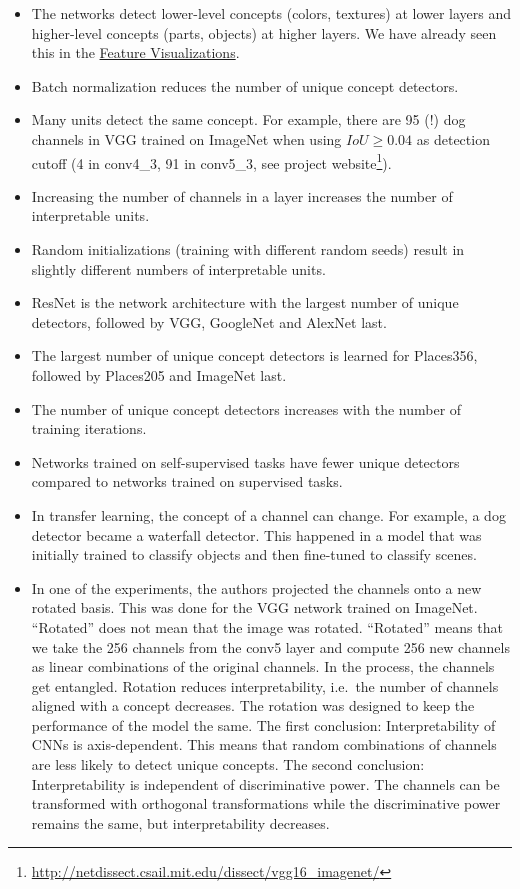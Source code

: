 \documentclass[
  10pt,
]{scrbook}
\providecommand{\tightlist}{%
  \setlength{\itemsep}{0pt}\setlength{\parskip}{0pt}}
\renewcommand{\href}[2]{#2\footnote{\url{#1}}}
\begin{document}
\begin{itemize}
\tightlist
\item
  The networks detect lower-level concepts (colors, textures) at lower layers and higher-level concepts (parts, objects) at higher layers.
  We have already seen this in the \protect\hyperlink{feature-visualization}{Feature Visualizations}.
\item
  Batch normalization reduces the number of unique concept detectors.
\item
  Many units detect the same concept.
  For example, there are 95 (!) dog channels in VGG trained on ImageNet when using \(IoU \geq 0.04\) as detection cutoff (4 in conv4\_3, 91 in conv5\_3, see \href{http://netdissect.csail.mit.edu/dissect/vgg16_imagenet/}{project website}).
\item
  Increasing the number of channels in a layer increases the number of interpretable units.
\item
  Random initializations (training with different random seeds) result in slightly different numbers of interpretable units.
\item
  ResNet is the network architecture with the largest number of unique detectors, followed by VGG, GoogleNet and AlexNet last.
\item
  The largest number of unique concept detectors is learned for Places356, followed by Places205 and ImageNet last.
\item
  The number of unique concept detectors increases with the number of training iterations.
\item
  Networks trained on self-supervised tasks have fewer unique detectors compared to networks trained on supervised tasks.
\item
  In transfer learning, the concept of a channel can change. For example, a dog detector became a waterfall detector. This happened in a model that was initially trained to classify objects and then fine-tuned to classify scenes.
\item
  In one of the experiments, the authors projected the channels onto a new rotated basis.
  This was done for the VGG network trained on ImageNet.
  ``Rotated'' does not mean that the image was rotated.
  ``Rotated'' means that we take the 256 channels from the conv5 layer and compute 256 new channels as linear combinations of the original channels.
  In the process, the channels get entangled.
  Rotation reduces interpretability, i.e.~the number of channels aligned with a concept decreases.
  The rotation was designed to keep the performance of the model the same.
  The first conclusion:
  Interpretability of CNNs is axis-dependent.
  This means that random combinations of channels are less likely to detect unique concepts.
  The second conclusion:
  Interpretability is independent of discriminative power.
  The channels can be transformed with orthogonal transformations while the discriminative power remains the same, but interpretability decreases.
\end{itemize}
\end{document}
